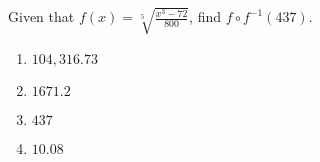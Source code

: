 \bigskip

\item Given that $\displaystyle f(x)=\sqrt[5]{\frac{x^3-72}{800}}$, find $f\circ f^{-1} (437)$.

    \begin{enumerate}
    \item $104,316.73$
    \item $1671.2$
    \item $437$
    \item $10.08$
    \end{enumerate}


